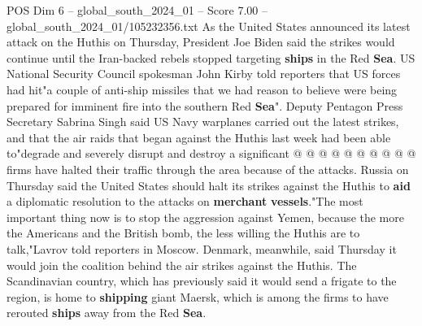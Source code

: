 \begin{textsample}{POS Dim 6 – global\_south\_2024\_01 – Score 7.00 – global\_south\_2024\_01/105232356.txt}
As the United States announced its latest attack on the Huthis on Thursday, President Joe Biden said the strikes would continue until the Iran-backed rebels stopped targeting \textbf{ships} in the Red \textbf{Sea}.
US National Security Council spokesman John Kirby told reporters that US forces had hit"a couple of anti-ship missiles that we had reason to believe were being prepared for imminent fire into the southern Red \textbf{Sea}".
Deputy Pentagon Press Secretary Sabrina Singh said US Navy warplanes carried out the latest strikes, and that the air raids that began against the Huthis last week had been able to"degrade and severely disrupt and destroy a significant @ @ @ @ @ @ @ @ @ @ firms have halted their traffic through the area because of the attacks.
Russia on Thursday said the United States should halt its strikes against the Huthis to \textbf{aid} a diplomatic resolution to the attacks on \textbf{merchant} \textbf{vessels}."The most important thing now is to stop the aggression against Yemen, because the more the Americans and the British bomb, the less willing the Huthis are to talk,"Lavrov told reporters in Moscow.
Denmark, meanwhile, said Thursday it would join the coalition behind the air strikes against the Huthis.
The Scandinavian country, which has previously said it would send a frigate to the region, is home to \textbf{shipping} giant Maersk, which is among the firms to have rerouted \textbf{ships} away from the Red \textbf{Sea}.

\end{textsample}

